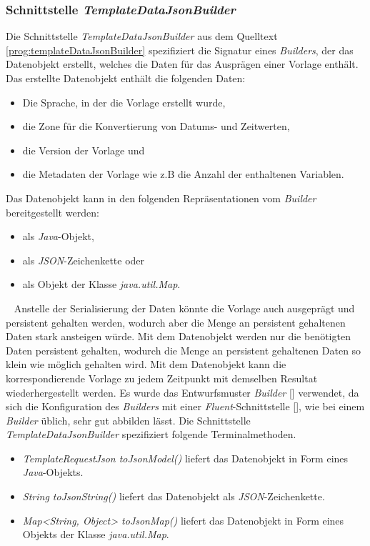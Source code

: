 \subsubsection{Schnittstelle \emph{TemplateDataJsonBuilder}}
\label{sec:templateDataJsonBuilder}
Die Schnittstelle \emph{TemplateDataJsonBuilder} aus dem Quelltext  \ref{prog:templateDataJsonBuilder} spezifiziert die Signatur eines \emph{Builders}, der das Datenobjekt erstellt, welches die Daten für das Ausprägen einer Vorlage enthält. Das erstellte Datenobjekt enthält die folgenden Daten:
\begin{itemize}
	\item Die Sprache, in der die Vorlage erstellt wurde,
	\item die Zone für die Konvertierung von Datums- und Zeitwerten,
	\item die Version der Vorlage und 
	\item die Metadaten der Vorlage wie z.B die Anzahl der enthaltenen Variablen.
\end{itemize} 
Das Datenobjekt kann in den folgenden Repräsentationen vom \emph{Builder} bereitgestellt werden:
\begin{itemize}
	\item als \emph{Java}-Objekt,
	\item als \emph{JSON}-Zeichenkette oder
	\item als Objekt der Klasse \emph{java.util.Map}.
\end{itemize}
\ \newline
Anstelle der Serialisierung der Daten könnte die Vorlage auch ausgeprägt und persistent gehalten werden, wodurch aber die Menge an persistent gehaltenen Daten stark ansteigen würde. Mit dem Datenobjekt werden nur die benötigten Daten persistent gehalten, wodurch die Menge an persistent gehaltenen Daten so klein wie möglich gehalten wird. Mit dem Datenobjekt kann die korrespondierende Vorlage zu jedem Zeitpunkt mit demselben Resultat wiederhergestellt werden.
\newline
\newline
Es wurde das Entwurfsmuster \emph{Builder} [\cite[97]{designPatterns}] verwendet, da sich die Konfiguration des \emph{Builders} mit einer \emph{Fluent}-Schnittstelle [\cite{fowlerFluentInterface}], wie bei einem \emph{Builder} üblich, sehr gut abbilden lässt. Die Schnittstelle \emph{TemplateDataJsonBuilder} spezifiziert folgende Terminalmethoden.
\begin{itemize}
	\item\emph{TemplateRequestJson toJsonModel()} liefert das Datenobjekt in Form eines \emph{Java}-Objekts.
	\item\emph{String toJsonString()} liefert das Datenobjekt als \emph{JSON}-Zeichenkette.
	\item\emph{Map<String, Object> toJsonMap()} liefert das Datenobjekt in Form eines Objekts der Klasse \emph{java.util.Map}.
\end{itemize} 
\ \newpage

